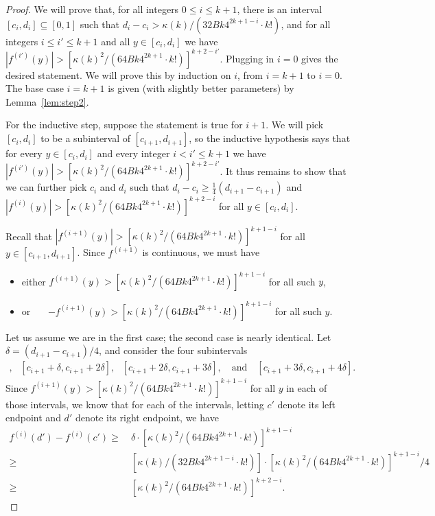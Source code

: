 \begin{proof}
We will prove that, for all integers  $0 \leq i \leq k+1$, there is an interval $[c_i,d_i] \subseteq [0,1]$ such that $d_i - c_i > \kappa(k) / (32 Bk4^{2k+1 - i} \cdot k!)$, and for all integers $i \leq i' \leq k+1$ and all $y\in [c_i,d_i]$ we have $|f^{(i')}(y)| > \left[ \kappa(k)^2 / (64 Bk4^{2k+1} \cdot k!) \right]^{k+2-i'}$. Plugging in $i=0$ gives the desired statement. We will prove this by induction on $i$, from $i=k+1$ to $i=0$. The base case $i=k+1$ is given (with slightly better parameters) by Lemma~\ref{lem:step2}.

For the inductive step, suppose the statement is true for $i+1$. We will pick $[c_i,d_i]$ to be a subinterval of $[c_{i+1},d_{i+1}]$, so the inductive hypothesis says that for every $y \in [c_i,d_i]$ and every integer $i < i' \leq k+1$ we have $|f^{(i')}(y)| > \left[ \kappa(k)^2 / (64 Bk4^{2k+1} \cdot k!) \right]^{k+2-i'}$. It thus remains to show that we can further pick $c_i$ and $d_i$ such that $d_i-c_i \geq \frac14 (d_{i+1} - c_{i+1})$ and $|f^{(i)}(y)| > \left[ \kappa(k)^2 / (64 Bk4^{2k+1} \cdot k!) \right]^{k+2-i}$ for all $y \in [c_i,d_i]$. 

Recall that $|f^{(i+1)}(y)| > \left[ \kappa(k)^2 / (64 Bk4^{2k+1} \cdot k!) \right]^{k+1-i}$ for all $y \in [c_{i+1},d_{i+1}]$. Since $f^{(i+1)}$ is continuous, we must have
\begin{itemize}
    \item either $f^{(i+1)}(y) > \left[ \kappa(k)^2 / (64 Bk4^{2k+1} \cdot k!) \right]^{k+1-i}$ for all such $y$,
    \item or ~~~$-f^{(i+1)}(y) > \left[ \kappa(k)^2 / (64 Bk4^{2k+1} \cdot k!) \right]^{k+1-i}$ for all such $y$.
\end{itemize}  
Let us assume we are in the first case; the second case is nearly identical. Let $\delta = (d_{i+1} - c_{i+1})/4$, and consider the four subintervals
\begin{align*}
    [c_{i+1}, c_{i+1} + \delta], ~~~ [c_{i+1} + \delta, c_{i+1} + 2\delta], ~~~ [c_{i+1} + 2\delta, c_{i+1} + 3\delta], \text{~~~and~~~} [c_{i+1} + 3\delta, c_{i+1} + 4\delta].
\end{align*} 
Since $f^{(i+1)}(y) > \left[ \kappa(k)^2 / (64 Bk4^{2k+1} \cdot k!) \right]^{k+1-i}$ for all $y$ in each of those intervals, we know that for each of the intervals, letting $c'$ denote its left endpoint and $d'$ denote its right endpoint, we have 
\begin{align*}
f^{(i)}(d') - f^{(i)}(c') 
\geq & ~ \delta \cdot \left[ \kappa(k)^2 / (64 Bk4^{2k+1} \cdot k!) \right]^{k+1-i} \\
\geq & ~ \left[ \kappa(k) / (32 Bk4^{2k+1 - i} \cdot k!) \right] \cdot \left[ \kappa(k)^2 / (64 Bk4^{2k+1} \cdot k!) \right]^{k+1-i} / 4 \\
\geq & ~ \left[ \kappa(k)^2 / (64 Bk4^{2k+1} \cdot k!) \right]^{k+2-i}.
\end{align*}


\end{proof}

